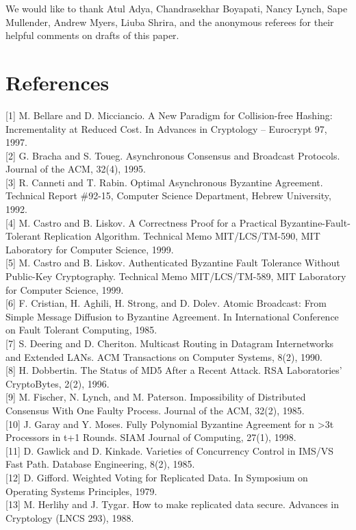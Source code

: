 \documentclass[
]{article}
\begin{document}
We would like to thank Atul Adya, Chandrasekhar Boyapati, Nancy Lynch,
Sape Mullender, Andrew Myers, Liuba Shrira, and the anonymous referees
for their helpful comments on drafts of this paper.

\section{References}\label{references}

{[}1{]} M. Bellare and D. Micciancio. A New Paradigm for Collision-free
Hashing: Incrementality at Reduced Cost. In Advances in Cryptology --
Eurocrypt 97, 1997.\\
{[}2{]} G. Bracha and S. Toueg. Asynchronous Consensus and Broadcast
Protocols. Journal of the ACM, 32(4), 1995.\\
{[}3{]} R. Canneti and T. Rabin. Optimal Asynchronous Byzantine
Agreement. Technical Report \#92-15, Computer Science Department, Hebrew
University, 1992.\\
{[}4{]} M. Castro and B. Liskov. A Correctness Proof for a Practical
Byzantine-Fault-Tolerant Replication Algorithm. Technical Memo
MIT/LCS/TM-590, MIT Laboratory for Computer Science, 1999.\\
{[}5{]} M. Castro and B. Liskov. Authenticated Byzantine Fault Tolerance
Without Public-Key Cryptography. Technical Memo MIT/LCS/TM-589, MIT
Laboratory for Computer Science, 1999.\\
{[}6{]} F. Cristian, H. Aghili, H. Strong, and D. Dolev. Atomic
Broadcast: From Simple Message Diffusion to Byzantine Agreement. In
International Conference on Fault Tolerant Computing, 1985.\\
{[}7{]} S. Deering and D. Cheriton. Multicast Routing in Datagram
Internetworks and Extended LANs. ACM Transactions on Computer Systems,
8(2), 1990.\\
{[}8{]} H. Dobbertin. The Status of MD5 After a Recent Attack. RSA
Laboratories' CryptoBytes, 2(2), 1996.\\
{[}9{]} M. Fischer, N. Lynch, and M. Paterson. Impossibility of
Distributed Consensus With One Faulty Process. Journal of the ACM,
32(2), 1985.\\
{[}10{]} J. Garay and Y. Moses. Fully Polynomial Byzantine Agreement for
n \textgreater3t Processors in t+1 Rounds. SIAM Journal of Computing,
27(1), 1998.\\
{[}11{]} D. Gawlick and D. Kinkade. Varieties of Concurrency Control in
IMS/VS Fast Path. Database Engineering, 8(2), 1985.\\
{[}12{]} D. Gifford. Weighted Voting for Replicated Data. In Symposium
on Operating Systems Principles, 1979.\\
{[}13{]} M. Herlihy and J. Tygar. How to make replicated data secure.
Advances in Cryptology (LNCS 293), 1988.
\end{document}
